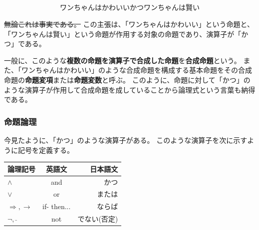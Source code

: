 \documentclass[a4j, 9pt]{ltjsarticle}
\renewcommand{\reviewstrike}[1]{\sout{#1}}
\def\ds{\displaystyle}
\begin{document}
      \begin{equation*}
        \begin{split}
          ワンちゃんはかわいい　かつ　ワンちゃんは賢い
        \end{split}
      \end{equation*}

      \reviewstrike{無論これは事実である。}
      この主張は、「ワンちゃんはかわいい」という命題と、「ワンちゃんは賢い」という命題が作用する対象の命題であり、演算子が「かつ」である。\par
      一般に、このような\textbf{複数の命題を演算子で合成した命題}を\textbf{合成命題}という。
      また、「ワンちゃんはかわいい」のような合成命題を構成する基本命題をその合成命題の\textbf{命題変項}または\textbf{命題変数}と呼ぶ。
      このように、命題に対して「かつ」のような演算子が作用して合成命題を成していることから論理式という言葉も納得である。

      \subsubsection{命題論理}
        今見たように、「かつ」のような演算子がある。
        このような演算子を次に示すように記号を定義する。\par

        \begin{center}
          \begin{table}[hbtp]
            \centering
            \begin{tabular}{lcr}
              \hline
              論理記号  & 英語文  &  日本語文  \\
              \hline \hline
                $\ds\land$                              & and         & かつ\\
                $\ds\lor$                               & or          & または\\
                $\ds\Longrightarrow, \longrightarrow$   & if- then... & ならば\\
                $\ds\lnot, \bar{　}$                    & not         & でない(否定)\\
            \end{tabular}
          \end{table}
        \end{center}
\end{document}
